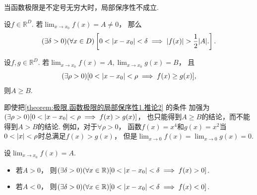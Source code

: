 \begin{remark}
当函数极限是不定号无穷大时，局部保序性不成立.
\end{remark}

\begin{corollary}\label{theorem:极限.函数极限的局部保序性1.推论1}
设\(f\in\mathbb{R}^D\).
若\(\lim_{x\to x_0} f(x) = A \neq 0\)，
那么\begin{equation*}
	(\exists \delta>0)
	(\forall x\in D)
	\left[
		0<\abs{x-x_0}<\delta
		\implies
		\abs{f(x)}>\frac12\abs{A}.
	\right].
\end{equation*}
\end{corollary}

\begin{corollary}\label{theorem:极限.函数极限的局部保序性1.推论2}
设\(f,g\in\mathbb{R}^D\).
若\(\lim_{x\to x_0} f(x) = A,
\lim_{x\to x_0} g(x) = B\)，
且\begin{equation*}
	(\exists\rho>0)[0<\abs{x-x_0}<\rho \implies f(x) \geq g(x)],
\end{equation*}
则\(A \geq B\).
\end{corollary}
\begin{remark}
即使把\cref{theorem:极限.函数极限的局部保序性1.推论2} 的条件
加强为\((\exists\rho>0)[0<\abs{x-x_0}<\rho \implies f(x) > g(x)]\)，
也只能得到\(A \geq B\)的结论，而不能得到\(A > B\)的结论.
例如，对于\(\forall\rho>0\)，
函数\(f(x) = x^4\)和\(g(x) = x^2\)当\(0<\abs{x}<\rho\)时总满足\(f(x) > g(x)\)，
但是\(\lim_{x\to0} f(x) = \lim_{x\to0} g(x) = 0\).
\end{remark}


\begin{corollary}[局部保号性]\label{theorem:极限.函数极限的局部保号性1}
设\(\lim_{x \to x_0} f(x) = A\).
\begin{itemize}
	\item 若\(A>0\)，
	则\((\exists\delta>0)
	(\forall x\in\mathbb{R})
	[0<\abs{x-x_0}<\delta \implies f(x)>0]\).
	\item 若\(A<0\)，
	则\((\exists\delta>0)
	(\forall x\in\mathbb{R})
	[0<\abs{x-x_0}<\delta \implies f(x)<0]\).
\end{itemize}
\end{corollary}

